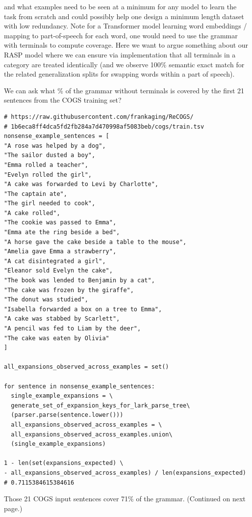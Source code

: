 \documentclass[11pt]{article}
\begin{document}
and what examples need to be seen at a minimum for any model to learn the task from scratch and could possibly help one design a minimum length dataset with low redundancy.
Note for a Transformer model learning word embeddings / mapping to part-of-speech for each word, one would need to use the grammar with terminals to compute coverage. Here we want to argue something about our RASP model where we can ensure via implementation that all terminals in a category are treated identically (and we observe 100\% semantic exact match for the related generalization splits for swapping words within a part of speech).


We can ask what \% of the grammar without terminals is covered by the first 21 sentences from the COGS training set?
\begin{tiny}
\begin{verbatim}
# https://raw.githubusercontent.com/frankaging/ReCOGS/
# 1b6eca8ff4dca5fd2fb284a7d470998af5083beb/cogs/train.tsv
nonsense_example_sentences = [
"A rose was helped by a dog",
"The sailor dusted a boy",
"Emma rolled a teacher",
"Evelyn rolled the girl",
"A cake was forwarded to Levi by Charlotte",
"The captain ate",
"The girl needed to cook",
"A cake rolled",
"The cookie was passed to Emma",
"Emma ate the ring beside a bed",
"A horse gave the cake beside a table to the mouse",
"Amelia gave Emma a strawberry",
"A cat disintegrated a girl",
"Eleanor sold Evelyn the cake",
"The book was lended to Benjamin by a cat",
"The cake was frozen by the giraffe",
"The donut was studied",
"Isabella forwarded a box on a tree to Emma",
"A cake was stabbed by Scarlett",
"A pencil was fed to Liam by the deer",
"The cake was eaten by Olivia"
]

all_expansions_observed_across_examples = set()

for sentence in nonsense_example_sentences:
  single_example_expansions = \
  generate_set_of_expansion_keys_for_lark_parse_tree\
  (parser.parse(sentence.lower()))
  all_expansions_observed_across_examples = \
  all_expansions_observed_across_examples.union\
  (single_example_expansions)

1 - len(set(expansions_expected) \
- all_expansions_observed_across_examples) / len(expansions_expected)
# 0.7115384615384616
\end{verbatim}
\end{tiny}
Those 21 COGS input sentences cover 71\% of the grammar. (Continued on next page.)
\end{document}
